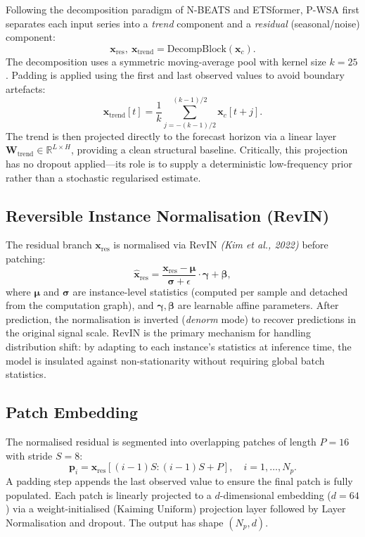\documentclass[11pt, letterpaper]{article}
\begin{document}
Following the decomposition paradigm of N-BEATS and ETSformer, P-WSA first separates each input series into a \textit{trend} component and a \textit{residual} (seasonal/noise) component:
\[
  \mathbf{x}_\text{res},\ \mathbf{x}_\text{trend} = \text{DecompBlock}(\mathbf{x}_c).
\]
The decomposition uses a symmetric moving-average pool with kernel size $k = 25$. Padding is applied using the first and last observed values to avoid boundary artefacts:
\[
  \mathbf{x}_\text{trend}[t] = \frac{1}{k}\sum_{j=-(k-1)/2}^{(k-1)/2} \mathbf{x}_c[t+j].
\]
The trend is then projected directly to the forecast horizon via a linear layer $\mathbf{W}_\text{trend} \in \mathbb{R}^{L \times H}$, providing a clean structural baseline. Critically, this projection has no dropout applied—its role is to supply a deterministic low-frequency prior rather than a stochastic regularised estimate.

\subsection{Reversible Instance Normalisation (RevIN)}
\label{sec:revin}

The residual branch $\mathbf{x}_\text{res}$ is normalised via RevIN \textit{(Kim et al., 2022)} before patching:
\[
  \hat{\mathbf{x}}_\text{res} = \frac{\mathbf{x}_\text{res} - \boldsymbol{\mu}}{\boldsymbol{\sigma} + \epsilon} \cdot \boldsymbol{\gamma} + \boldsymbol{\beta},
\]
where $\boldsymbol{\mu}$ and $\boldsymbol{\sigma}$ are instance-level statistics (computed per sample and detached from the computation graph), and $\boldsymbol{\gamma},\boldsymbol{\beta}$ are learnable affine parameters. After prediction, the normalisation is inverted (\textit{denorm} mode) to recover predictions in the original signal scale. RevIN is the primary mechanism for handling distribution shift: by adapting to each instance's statistics at inference time, the model is insulated against non-stationarity without requiring global batch statistics.

\subsection{Patch Embedding}
\label{sec:patch}

The normalised residual is segmented into overlapping patches of length $P = 16$ with stride $S = 8$:
\[
  \mathbf{p}_i = \mathbf{x}_\text{res}[(i-1)S : (i-1)S + P], \quad i = 1, \ldots, N_p.
\]
A padding step appends the last observed value to ensure the final patch is fully populated. Each patch is linearly projected to a $d$-dimensional embedding ($d = 64$) via a weight-initialised ($\text{Kaiming Uniform}$) projection layer followed by Layer Normalisation and dropout. The output has shape $(N_p, d)$.
\end{document}
